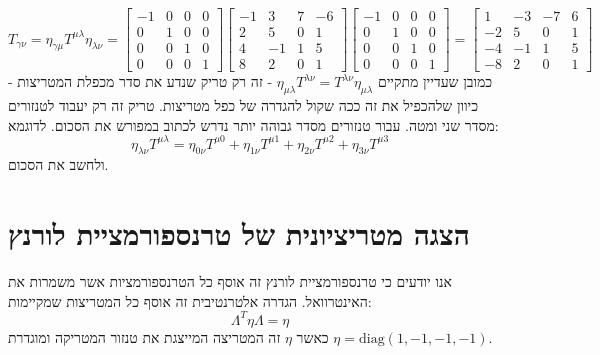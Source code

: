 \documentclass{tstextbook}
\begin{document}
\begin{example}
$$ {T}_{\gamma\nu}=\eta _{\gamma \mu}T^{\mu\lambda}\eta_{\lambda\nu}=\begin{bmatrix}-1&0&0&0\\0&1&0&0\\0&0&1&0\\0&0&0&1\end{bmatrix}\begin{bmatrix}-1&3&7&-6\\2&5&0&1\\4&-1&1&5\\8&2&0&1\end{bmatrix}\begin{bmatrix}-1&0&0&0\\0&1&0&0\\0&0&1&0\\0&0&0&1\end{bmatrix}=\begin{bmatrix}1&-3&-7&6\\-2&5&0&1\\-4&-1&1&5\\-8&2&0&1\end{bmatrix}$$
כמובן שעדיין מתקיים \(\eta_{\mu \lambda}T^{\lambda \nu}=T^{\lambda \nu}\eta_{\mu \lambda}\) - זה רק טריק שנדע את סדר מכפלת המטריצות - כיוון שלהכפיל את זה ככה שקול להגדרה של כפל מטריצות. טריק זה רק יעבוד לטנזורים מסדר שני ומטה. עבור טנזורים מסדר גבוהה יותר נדרש לכתוב במפורש את הסכום. לדוגמא:
$$\eta_{\lambda \nu}T^{\mu \lambda}=\eta_{0\nu}T^{\mu 0}+\eta_{1\nu}T^{\mu 1}+\eta_{2 \nu}T^{\mu 2}+\eta_{3 \nu} T^{\mu 3}$$
ולחשב את הסכום.

\end{example}
\section{הצגה מטריציונית של טרנספורמציית לורנץ}

אנו יודעים כי טרנספורמציית לורנץ זה אוסף כל הטרנספורמציות אשר משמרות את האינטרוואל. הגדרה אלטרנטיבית זה אוסף כל המטריצות שמקיימות:
$$\Lambda^{T} \eta \Lambda=\eta$$
כאשר \(\eta\) זה המטריצה המייצגת את טנזור המטריקה ומוגדרת \(\eta=\mathrm{diag}(1,-1,-1,-1)\).
\end{document}

